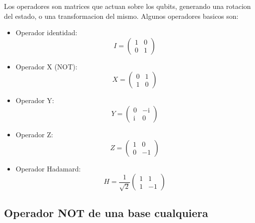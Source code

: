 \documentclass[11pt]{article}
\newcommand{\ii}{\mathrm{i}}
\begin{document}
Los operadores son matrices que actuan sobre los qubits, generando una rotacion del estado, o una transformacion del mismo. Algunos operadores basicos son:

\begin{itemize}
    \item Operador identidad:
    \begin{equation}
        I = \begin{pmatrix} 1 & 0 \\ 0 & 1 \end{pmatrix}
    \end{equation}
    
    \item Operador X (NOT):
    \begin{equation}
        X = \begin{pmatrix} 0 & 1 \\ 1 & 0 \end{pmatrix}
    \end{equation}
    
    \item Operador Y:
    \begin{equation}
        Y = \begin{pmatrix} 0 & -\ii \\ \ii & 0 \end{pmatrix}
    \end{equation}
    
    \item Operador Z:
    \begin{equation}
        Z = \begin{pmatrix} 1 & 0 \\ 0 & -1 \end{pmatrix}
    \end{equation}
    
    \item Operador Hadamard:
    \begin{equation}
        H = \frac{1}{\sqrt{2}} \begin{pmatrix} 1 & 1 \\ 1 & -1 \end{pmatrix}
    \end{equation}
\end{itemize}

\subsection{Operador NOT de una base cualquiera}
\end{document}
